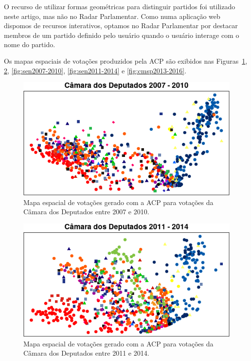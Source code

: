 \documentclass[a4paper, 12pt]{article}
\begin{document}
O recurso de utilizar formas geométricas para distinguir partidos foi utilizado neste artigo, mas não no Radar Parlamentar. Como numa aplicação web dispomos de recursos interativos, optamos no Radar Parlamentar por destacar membros de um partido definido pelo usuário quando o usuário interage com o nome do partido.

Os mapas espaciais de votações produzidos pela ACP são exibidos nas Figuras~\ref{fig:cdep2007-2010}, \ref{fig:cdep2011-2014}, \ref{fig:sen2007-2010}, \ref{fig:sen2011-2014} e \ref{fig:cmsp2013-2016}.

\begin{figure}[h!]
  \centering
  \includegraphics[scale=0.9]{figs/cdep2007-2010.png}
  \caption{Mapa espacial de votações gerado com a ACP para votações da Câmara dos Deputados entre 2007 e 2010.}
  \label{fig:cdep2007-2010}
\end{figure}

\begin{figure}[h!]
  \centering
  \includegraphics[scale=0.9]{figs/cdep2011-2014.png}
  \caption{Mapa espacial de votações gerado com a ACP para votações da Câmara dos Deputados entre 2011 e 2014.}
  \label{fig:cdep2011-2014}
\end{figure}
\end{document}
